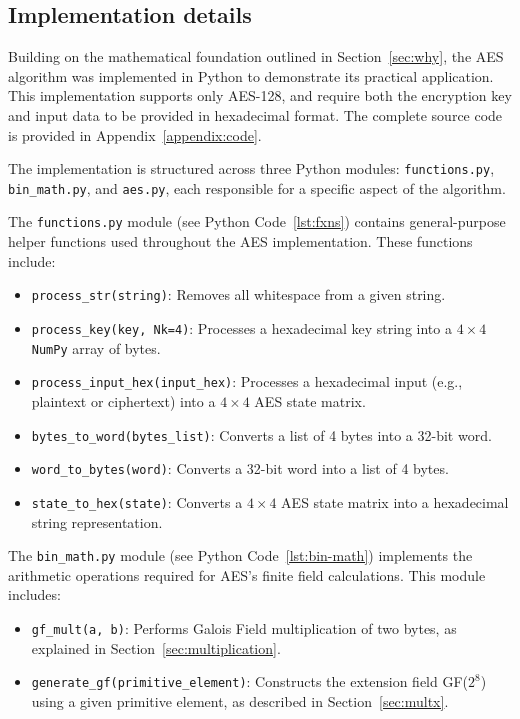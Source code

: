 \subsection{Implementation details}

Building on the mathematical foundation outlined in Section~\ref{sec:why}, the AES algorithm was implemented in Python to demonstrate its practical application.
This implementation supports only AES-128, and require both the encryption key and input data to be provided in hexadecimal format. 
The complete source code is provided in Appendix~\ref{appendix:code}.

The implementation is structured across three Python modules: \texttt{functions.py}, \texttt{bin\_math.py}, and \texttt{aes.py}, each responsible for a specific aspect of the algorithm.

The \texttt{functions.py} module (see Python Code~\ref{lst:fxns}) contains general-purpose helper functions used throughout the AES implementation. 
These functions include:
\begin{itemize}
    \item \texttt{process\_str(string)}: Removes all whitespace from a given string.
    \item \texttt{process\_key(key, Nk=4)}: Processes a hexadecimal key string into a $4\times4$ \texttt{NumPy} array of bytes.
    \item \texttt{process\_input\_hex(input\_hex)}: Processes a hexadecimal input (e.g., plaintext or ciphertext) into a $4\times4$ AES state matrix.
    \item \texttt{bytes\_to\_word(bytes\_list)}: Converts a list of 4 bytes into a 32-bit word.
    \item \texttt{word\_to\_bytes(word)}: Converts a 32-bit word into a list of 4 bytes.
    \item \texttt{state\_to\_hex(state)}: Converts a $4\times4$ AES state matrix into a hexadecimal string representation.
\end{itemize}

The \texttt{bin\_math.py} module (see Python Code~\ref{lst:bin-math}) implements the arithmetic operations required for AES's finite field calculations. 
This module includes:
\begin{itemize}
    \item \texttt{gf\_mult(a, b)}: Performs Galois Field multiplication of two bytes, as explained in Section~\ref{sec:multiplication}.
    \item \texttt{generate\_gf(primitive\_element)}: Constructs the extension field GF($2^8$) using a given primitive element, as described in Section~\ref{sec:multx}.
\end{itemize}

